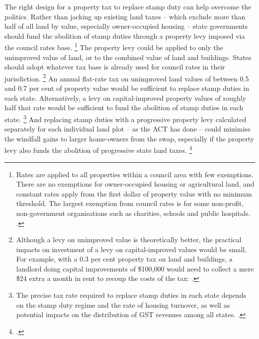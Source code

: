 The right design for a property tax to replace stamp duty can help overcome the politics.
Rather than jacking up existing land taxes -- which exclude more than half of all land by value, especially owner-occupied housing -- state governments should fund the abolition of stamp duties through a property levy imposed via the council rates base.%
	\footnote{Rates are applied to all properties within a council area with few exemptions.
	There are no exemptions for owner-occupied housing or agricultural land, and constant rates apply from the first dollar of property value with no minimum threshold.
	The largest exemption from council rates is for some non-profit, non-government organisations such as charities, schools and public hospitals. \textcite[][16]{DaleyCoates-2015-Property-taxes}.}
The property levy could be applied to only the unimproved value of land, or to the combined value of land and buildings. States should adopt whatever tax base is already used for council rates in their jurisdiction.%
	\footnote{Although a levy on unimproved value is theoretically better, the practical impacts on investment of a levy on capital-improved values would be small. For example, with a 0.3 per cent property tax on land and buildings, a landlord doing capital improvements of \$100,000 would
	need to collect a mere \$24 extra a month in rent to recoup the
	costs of the tax: \textcite[][Box~2]{DaleyCoates-2015-Property-taxes}.} 
An annual flat-rate tax on unimproved land values of between 0.5 and 0.7 per cent of property value would be sufficient to replace stamp duties in each state. Alternatively, a levy on capital-improved property values of roughly half that rate would be sufficient to fund the abolition of stamp duties in each state.%
	\footnote{The precise tax rate required to replace stamp duties in each state depends on the stamp duty regime and the rate of housing turnover, as well as potential impacts on the distribution of GST revenues among all states. \textcites{Coates2017PropertyTaxReformAdelaide}[][8]{DaleyCoates-2015-Property-taxes}.} 
And replacing stamp duties with a progressive property levy calculated separately for each individual land plot -- as the ACT has done -- could minimise the windfall gains to larger home-owners from the swap, especially if the property levy also funds the abolition of progressive state land taxes.%
    \footnote{\textcites[][]{Coates2017PropertyTaxReformAdelaide}[][15]{Freebairn-2017-Reform-options-for-state-property-taxes}.}

